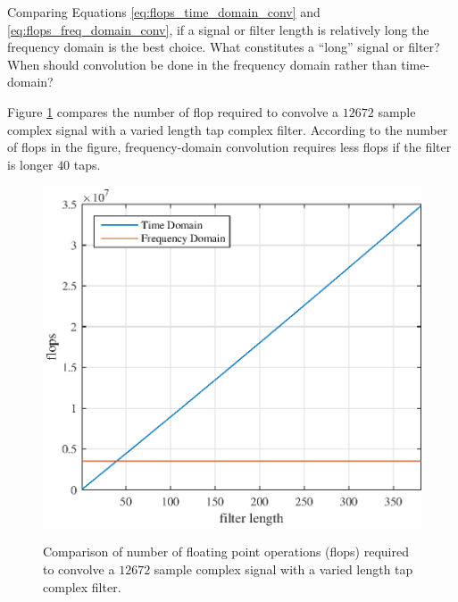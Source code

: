 Comparing Equations \ref{eq:flops_time_domain_conv} and \ref{eq:flops_freq_domain_conv}, if a signal or filter length is relatively long the frequency domain is the best choice.
What constitutes a ``long'' signal or filter?
When should convolution be done in the frequency domain rather than time-domain?

Figure \ref{fig:Theory12672signal_flops} compares the number of flop required to convolve a $12672$ sample complex signal with a varied length tap complex filter.
According to the number of flops in the figure, frequency-domain convolution requires less flops if the filter is longer $40$ taps.
\begin{figure}
	\centering\includegraphics[width=5in]{figures/gpu_intro/Theory12672signal_flops.eps}
	\label{fig:Theory12672signal_flops}
	\caption{Comparison of number of floating point operations (flops) required to convolve a $12672$ sample complex signal with a varied length tap complex filter.}
\end{figure}

